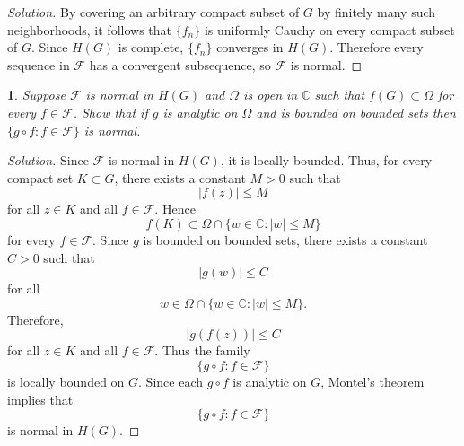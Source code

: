 \documentclass[12pt, a4paper]{report}
\theoremstyle{spaced}
\newtheorem{exercise}{}
\newcommand{\setexercise}[1]{\setcounter{exercise}{#1-1}}
\begin{document}
\begin{proof}[Solution]
	By covering an arbitrary compact subset of \(G\) by finitely many such
	neighborhoods, it follows that \(\{f_n\}\) is uniformly Cauchy on every
	compact subset of \(G\). Since \(H(G)\) is complete, \(\{f_n\}\)
	converges in \(H(G)\).
	Therefore every sequence in \(\mathcal{F}\) has a convergent
	subsequence, so \(\mathcal{F}\) is normal.
\end{proof}

\setexercise{7}
\begin{exercise}
	Suppose $\mathcal{F}$ is normal in $H(G)$ and $\Omega$ is open in $\mathbb{C}$
	such that $f(G)\subset\Omega$ for every $f\in\mathcal{F}$. Show that if
	$g$ is analytic on $\Omega$ and is bounded on bounded sets then
	$\{g\circ f : f\in\mathcal{F}\}$ is normal.
\end{exercise}
\begin{proof}[Solution]
	Since \(\mathcal{F}\) is normal in \(H(G)\), it is locally bounded. Thus, for every compact set \(K\subset G\), there exists a constant \(M>0\) such that
	\[
		|f(z)|\leq M
	\]
	for all \(z\in K\) and all \(f\in\mathcal{F}\).
	Hence
	\[
		f(K)\subset \Omega\cap\{w\in\mathbb{C}:|w|\leq M\}
	\]
	for every \(f\in\mathcal{F}\). Since \(g\) is bounded on bounded sets, there exists a constant \(C>0\) such that
	\[
		|g(w)|\leq C
	\]
	for all
	\[
		w\in \Omega\cap\{w\in\mathbb{C}:|w|\leq M\}.
	\]
	Therefore,
	\[
		|g(f(z))|\leq C
	\]
	for all \(z\in K\) and all \(f\in\mathcal{F}\).
	Thus the family
	\[
		\{g\circ f:f\in\mathcal{F}\}
	\]
	is locally bounded on \(G\). Since each \(g\circ f\) is analytic on \(G\), Montel's theorem implies that
	\[
		\{g\circ f:f\in\mathcal{F}\}
	\]
	is normal in \(H(G)\).
\end{proof}
\end{document}
